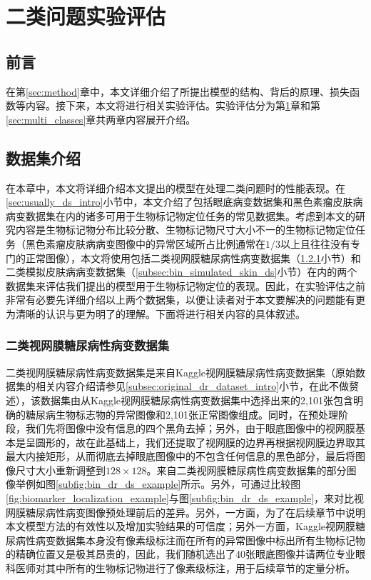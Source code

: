 \chapter{二类问题实验评估}\label{sec:experiments}
\section{前言}
在第\ref{sec:method}章中，本文详细介绍了所提出模型的结构、背后的原理、损失函数等内容。接下来，本文将进行相关实验评估。实验评估分为第\ref{sec:experiments}章和第\ref{sec:multi_classes}章共两章内容展开介绍。{\color{red}{TODO}}
\section{数据集介绍}
在本章中，本文将详细介绍本文提出的模型在处理二类问题时的性能表现。在\ref{sec:usually_ds_intro}小节中，本文介绍了包括眼底病变数据集和黑色素瘤皮肤病病变数据集在内的诸多可用于生物标记物定位任务的常见数据集。考虑到本文的研究内容是生物标记物分布比较分散、生物标记物尺寸大小不一的生物标记物定位任务（黑色素瘤皮肤病病变图像中的异常区域所占比例通常在$1/3$以上且往往没有专门的正常图像），本文将使用包括二类视网膜糖尿病性病变数据集（\ref{subsec:bin_dr_ds}小节）和二类模拟皮肤病病变数据集（\ref{subsec:bin_simulated_skin_ds}小节）在内的两个数据集来评估我们提出的模型用于生物标记物定位的表现。因此，在实验评估之前非常有必要先详细介绍以上两个数据集，以便让读者对于本文要解决的问题能有更为清晰的认识与更为明了的理解。下面将进行相关内容的具体叙述。
\subsection{二类视网膜糖尿病性病变数据集}\label{subsec:bin_dr_ds}
二类视网膜糖尿病性病变数据集是来自Kaggle视网膜糖尿病性病变数据集（原始数据集的相关内容介绍请参见\ref{subsec:original_dr_dataset_intro}小节，在此不做赘述），该数据集由从Kaggle视网膜糖尿病性病变数据集中选择出来的2,101张包含明确的糖尿病生物标志物的异常图像和2,101张正常图像组成。同时，在预处理阶段，我们先将图像中没有信息的四个黑角去掉；另外，由于眼底图像中的视网膜基本是呈圆形的，故在此基础上，我们还提取了视网膜的边界再根据视网膜边界取其最大内接矩形，从而彻底去掉眼底图像中的不包含任何信息的黑色部分，最后将图像尺寸大小重新调整到$128\times 128$。来自二类视网膜糖尿病性病变数据集的部分图像举例如图\ref{subfig:bin_dr_ds_example}所示。另外，可通过比较图\ref{fig:biomarker_localization_example}与图\ref{subfig:bin_dr_ds_example}，来对比视网膜糖尿病性病变图像预处理前后的差异。另外，一方面，为了在后续章节中说明本文模型方法的有效性以及增加实验结果的可信度；另外一方面，Kaggle视网膜糖尿病性病变数据集本身没有像素级标注而在所有的异常图像中标出所有生物标记物的精确位置又是极其昂贵的，因此，我们随机选出了40张眼底图像并请两位专业眼科医师对其中所有的生物标记物进行了像素级标注，用于后续章节的定量分析。


